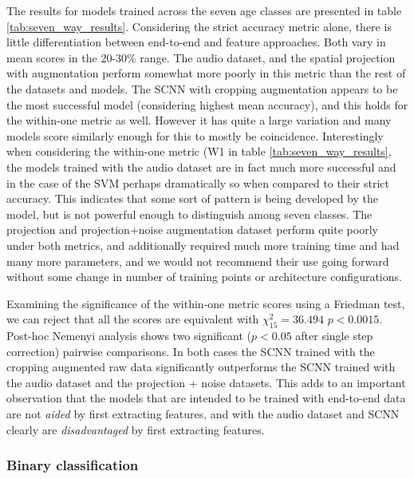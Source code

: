 \documentclass[utf8]{frontiersSCNS} %
\begin{document}
The results for models trained across the seven age classes are presented in table \ref{tab:seven_way_results}. Considering the strict accuracy metric alone, there is little differentiation between end-to-end and feature approaches. Both vary in mean scores in the 20-30\% range. The audio dataset, and the spatial projection with augmentation perform somewhat more poorly in this metric than the rest of the datasets and models. The SCNN with cropping augmentation appears to be the most successful model (considering highest mean accuracy), and this holds for the within-one metric as well. However it has quite a large variation and many models score similarly enough for this to mostly be coincidence. Interestingly when considering the within-one metric (W1 in table \ref{tab:seven_way_results}, the models trained with the audio dataset are in fact much more successful and in the case of the SVM perhaps dramatically so when compared to their strict accuracy. This indicates that some sort of pattern is being developed by the model, but is not powerful enough to distinguish among seven classes. The projection and projection+noise augmentation dataset perform quite poorly under both metrics, and additionally required much more training time and had many more parameters, and we would not recommend their use going forward without some change in number of training points or architecture configurations.

Examining the significance of the within-one metric scores using a Friedman test, we can reject that all the scores are equivalent with $\chi^2_{15}=36.494$ $p<0.0015$. Post-hoc Nemenyi analysis shows two significant ($p<0.05$ after single step correction) pairwise comparisons. In both cases the SCNN trained with the cropping augmented raw data significantly outperforms the SCNN trained with the audio dataset and the projection + noise datasets. This adds to an important observation that the models that are intended to be trained with end-to-end data are not {\em aided} by first extracting features, and with the audio dataset and SCNN clearly are {\em disadvantaged} by first extracting features. 

\subsubsection{Binary classification}
\end{document}
